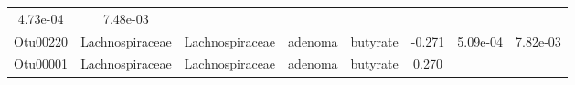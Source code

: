 \documentclass[11pt,]{article}
\begin{document}
\begin{longtable}[]{@{}cccccccc@{}}
\begin{minipage}[t]{0.08\columnwidth}
4.73e-04\strut
\end{minipage} & \begin{minipage}[t]{0.08\columnwidth}\centering\strut
7.48e-03\strut
\end{minipage}\tabularnewline
\begin{minipage}[t]{0.08\columnwidth}\centering\strut
Otu00220\strut
\end{minipage} & \begin{minipage}[t]{0.15\columnwidth}\centering\strut
Lachnospiraceae\strut
\end{minipage} & \begin{minipage}[t]{0.15\columnwidth}\centering\strut
Lachnospiraceae\strut
\end{minipage} & \begin{minipage}[t]{0.08\columnwidth}\centering\strut
adenoma\strut
\end{minipage} & \begin{minipage}[t]{0.09\columnwidth}\centering\strut
butyrate\strut
\end{minipage} & \begin{minipage}[t]{0.07\columnwidth}\centering\strut
-0.271\strut
\end{minipage} & \begin{minipage}[t]{0.08\columnwidth}\centering\strut
5.09e-04\strut
\end{minipage} & \begin{minipage}[t]{0.08\columnwidth}\centering\strut
7.82e-03\strut
\end{minipage}\tabularnewline
\begin{minipage}[t]{0.08\columnwidth}\centering\strut
Otu00001\strut
\end{minipage} & \begin{minipage}[t]{0.15\columnwidth}\centering\strut
Lachnospiraceae\strut
\end{minipage} & \begin{minipage}[t]{0.15\columnwidth}\centering\strut
Lachnospiraceae\strut
\end{minipage} & \begin{minipage}[t]{0.08\columnwidth}\centering\strut
adenoma\strut
\end{minipage} & \begin{minipage}[t]{0.09\columnwidth}\centering\strut
butyrate\strut
\end{minipage} & \begin{minipage}[t]{0.07\columnwidth}\centering\strut
0.270\strut
\end{minipage} & \begin{minipage}[t]{0.08\columnwidth}\centering\strut

\end{minipage}
\end{longtable}
\end{document}
